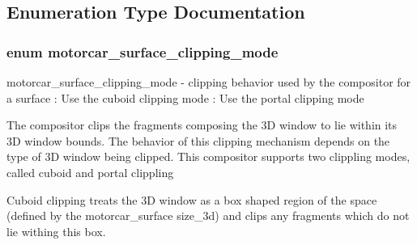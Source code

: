 \subsection{Enumeration Type Documentation}
\hypertarget{motorcar-server-protocol_8h_a4609d9d55b9d8b4d07c8dd85fa4ec19d}{
\subsubsection[{motorcar\-\_\-surface\-\_\-clipping\-\_\-mode}]{\setlength{\rightskip}{0pt plus 5cm}enum {\bf motorcar\-\_\-surface\-\_\-clipping\-\_\-mode}}}\label{motorcar-server-protocol_8h_a4609d9d55b9d8b4d07c8dd85fa4ec19d}
motorcar\-\_\-surface\-\_\-clipping\-\_\-mode -\/ clipping behavior used by the compositor for a surface \-: Use the cuboid clipping mode \-: Use the portal clipping mode

The compositor clips the fragments composing the 3\-D window to lie within its 3\-D window bounds. The behavior of this clipping mechanism depends on the type of 3\-D window being clipped. This compositor supports two clippling modes, called cuboid and portal clippling

Cuboid clipping treats the 3\-D window as a box shaped region of the space (defined by the motorcar\-\_\-surface size\-\_\-3d) and clips any fragments which do not lie withing this box.

